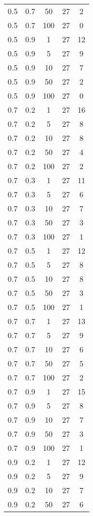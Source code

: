 \begin{appendices}
\begin{longtable}{|c|c|c|c|c|}
		0.5 & 0.7 & 50  & 27 & 2  \\
		0.5 & 0.7 & 100 & 27 & 0  \\ \hline
		0.5 & 0.9 & 1   & 27 & 12 \\
		0.5 & 0.9 & 5   & 27 & 9  \\
		0.5 & 0.9 & 10  & 27 & 7  \\
		0.5 & 0.9 & 50  & 27 & 2  \\
		0.5 & 0.9 & 100 & 27 & 0  \\ \hline
		0.7 & 0.2 & 1   & 27 & 16 \\
		0.7 & 0.2 & 5   & 27 & 8  \\
		0.7 & 0.2 & 10  & 27 & 8  \\
		0.7 & 0.2 & 50  & 27 & 4  \\
		0.7 & 0.2 & 100 & 27 & 2  \\ \hline
		0.7 & 0.3 & 1   & 27 & 11 \\
		0.7 & 0.3 & 5   & 27 & 6  \\
		0.7 & 0.3 & 10  & 27 & 7  \\
		0.7 & 0.3 & 50  & 27 & 3  \\
		0.7 & 0.3 & 100 & 27 & 1  \\ \hline
		0.7 & 0.5 & 1   & 27 & 12 \\
		0.7 & 0.5 & 5   & 27 & 8  \\
		0.7 & 0.5 & 10  & 27 & 8  \\
		0.7 & 0.5 & 50  & 27 & 3  \\
		0.7 & 0.5 & 100 & 27 & 1  \\ \hline
		0.7 & 0.7 & 1   & 27 & 13 \\
		0.7 & 0.7 & 5   & 27 & 9  \\
		0.7 & 0.7 & 10  & 27 & 6  \\
		0.7 & 0.7 & 50  & 27 & 5  \\
		0.7 & 0.7 & 100 & 27 & 2  \\ \hline
		0.7 & 0.9 & 1   & 27 & 15 \\
		0.7 & 0.9 & 5   & 27 & 8  \\
		0.7 & 0.9 & 10  & 27 & 7  \\
		0.7 & 0.9 & 50  & 27 & 3  \\
		0.7 & 0.9 & 100 & 27 & 1  \\ \hline
		0.9 & 0.2 & 1   & 27 & 12 \\
		0.9 & 0.2 & 5   & 27 & 9  \\
		0.9 & 0.2 & 10  & 27 & 7  \\
		0.9 & 0.2 & 50  & 27 & 6  \\

\end{longtable}
\end{appendices}
